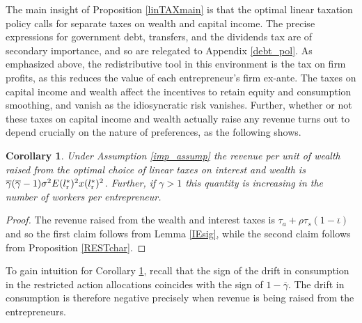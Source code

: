 \documentclass[11pt]{article}
\theoremstyle{plain}
\newtheorem{corl}[thm]{Corollary}
\begin{document}
The main insight of Proposition \ref{linTAXmain} is that the optimal linear taxation policy calls for separate taxes on wealth and capital income. The precise expressions for government debt, transfers, and the dividends tax are of secondary importance, and so are relegated to Appendix \ref{debt_pol}. As emphasized above, the redistributive tool in this environment is the tax on firm profits, as this reduces the value of each entrepreneur's firm ex-ante. The taxes on capital income and wealth affect the incentives to retain equity and consumption smoothing, and vanish as the idiosyncratic risk vanishes. Further, whether or not these taxes on capital income and wealth actually raise any revenue turns out to depend crucially on the nature of preferences, as the following shows. 


\begin{corl}\label{colREVENUEmain}
Under Assumption \ref{imp_assump} the revenue per unit of wealth raised from the optimal choice of linear taxes on interest and wealth is $\overline{\gamma}(\overline{\gamma}-1) \sigma^2 E(l_{\textnormal{r}}^*)^2 x(l_{\textnormal{r}}^*)^2$. Further, if $\gamma>1$ this quantity is increasing in the number of workers per entrepreneur. 
\end{corl}

\begin{proof}
The revenue raised from the wealth and interest taxes is $\tau_a + \rho \tau_s(1-\overline{\iota})$ and so the first claim follows from Lemma \ref{IEsig}, while the second claim follows from Proposition \ref{RESTchar}. 
\end{proof}

To gain intuition for Corollary \ref{colREVENUEmain}, recall that the sign of the drift in consumption in the restricted action allocations coincides with the sign of $1-\overline{\gamma}$. The drift in consumption is therefore negative precisely when revenue is being raised from the entrepreneurs. 
\end{document}
